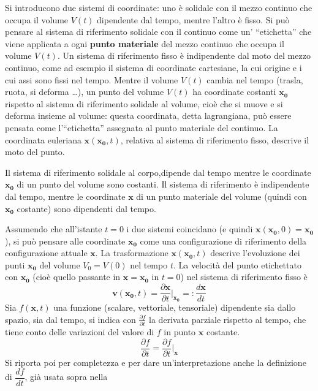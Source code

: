 Si introducono due sistemi di coordinate: uno è solidale con il mezzo continuo che occupa il volume $V(t)$ dipendente dal tempo, mentre l'altro è fisso. 
Si può pensare al sistema di riferimento solidale con il continuo come un' ``etichetta'' che viene applicata a ogni \textbf{punto materiale} del mezzo continuo che occupa il volume $V(t)$. Un sistema di riferimento fisso è indipendente dal moto del mezzo continuo, come ad esempio il sistema di coordinate cartesiane, la cui origine e i cui assi sono fissi nel tempo.
%
Mentre il volume $V(t)$ cambia nel tempo (trasla, ruota, si deforma \dots), un punto del volume $V(t)$ ha coordinate costanti $\bm{x_0}$ rispetto al sistema di riferimento solidale al volume, cioè che si muove e si deforma insieme al volume: questa coordinata, detta lagrangiana, può essere pensata come l'``etichetta'' assegnata al punto materiale del continuo. La coordinata euleriana $\bm{x}(\bm{x_0},t)$, relativa al sistema di riferimento fisso, descrive il moto del punto.
%
\begin{remark}
 Il sistema di riferimento solidale al corpo,dipende dal tempo mentre le coordinate $\bm{x_0}$ di un punto del volume sono costanti.
 Il sistema di riferimento è indipendente dal tempo, mentre le coordinate $\bm{x}$ di un punto materiale del volume (quindi con $\bm{x_0}$ costante) sono dipendenti dal tempo.
\end{remark}
% 
Assumendo che all'istante $t=0$ i due sistemi coincidano (e quindi $\bm{x}(\bm{x_0},0) = \bm{x_0}$), si può pensare alle coordinate $\bm{x_0}$ come una configurazione di riferimento della configurazione attuale $\bm{x}$. La trasformazione $\bm{x}(\bm{x_0},t)$ descrive l'evoluzione dei punti $\bm{x_0}$ del volume $V_0 = V(0)$ nel tempo $t$. La velocità del punto etichettato con $\bm{x_0}$ (cioè quello passante in $\bm{x}=\bm{x_0}$ in $t=0$) nel sistema di riferimento fisso è
 \begin{equation}
  \bm{v}(\bm{x_0},t) = \dfrac{\partial \bm{x}}{\partial t}\bigg|_{\bm{x_0}} =: \dfrac{d \bm{x}}{d t}
 \end{equation}
%
 Sia $f(\bm{x},t)$ una funzione (scalare, vettoriale, tensoriale) dipendente sia dallo spazio, sia dal tempo, si indica con
 $\frac{\partial f}{\partial t}$ la derivata parziale rispetto al tempo, che tiene conto delle variazioni del
 valore di $f$ in punto $\bm{x}$ costante.
 \begin{equation}
  \dfrac{\partial f}{\partial t} = \dfrac{\partial f}{\partial t}\bigg|_{\bm{x}}
 \end{equation}
Si riporta poi per completezza e per dare un'interpretazione anche la definizione di $\dfrac{d f}{d t}$, già usata sopra nella
